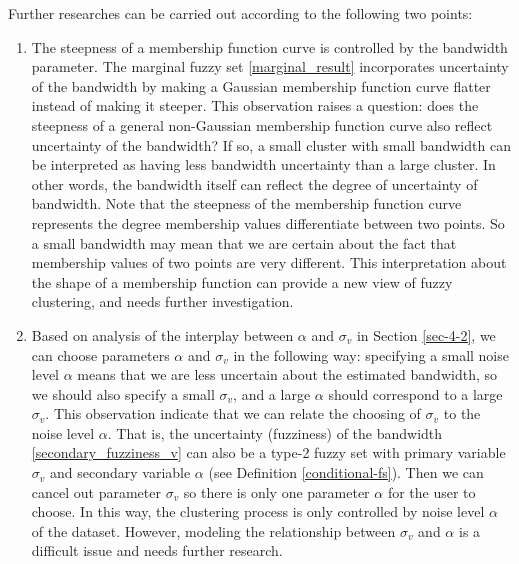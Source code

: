 \documentclass[journal]{IEEEtran}
\theoremstyle{definition}
\begin{document}
Further researches can be carried out according to the following two points:
\begin{enumerate}
\item The steepness of a membership function curve is controlled by the bandwidth parameter. The marginal fuzzy set \ref{marginal_result} incorporates uncertainty of the bandwidth by making a Gaussian membership function curve flatter instead of making it steeper. This observation raises a question: does the steepness of a general non-Gaussian membership function curve also reflect uncertainty of the bandwidth? If so, a small cluster with small bandwidth can be interpreted as having less bandwidth uncertainty than a large cluster. In other words, the bandwidth itself can reflect the degree of uncertainty of bandwidth. Note that the steepness of the membership function curve represents the degree membership values differentiate between two points. So a small bandwidth may mean that we are certain about the fact that membership values of two points are very different. This interpretation about the shape of a  membership function can provide a new view of fuzzy clustering, and needs further investigation.
\item Based on analysis of the interplay between $\alpha$ and $\sigma_v$ in Section \ref{sec-4-2}, we can choose parameters $\alpha$ and $\sigma_v$ in the following way: specifying a small noise level $\alpha$ means that we are less uncertain about the estimated bandwidth, so we should also specify a small $\sigma_v$, and a large $\alpha$ should correspond to a large $\sigma_v$. This observation indicate that we can relate the choosing of $\sigma_v$ to the noise level $\alpha$. That is, the uncertainty (fuzziness) of the bandwidth \eqref{secondary_fuzziness_v} can also be a type-2 fuzzy set with primary variable $\sigma_v$ and secondary variable $\alpha$ (see Definition \ref{conditional-fs}). Then we can cancel out  parameter $\sigma_v$ so there is only one parameter $\alpha$ for the user to choose. In this way, the clustering process is only controlled by noise level $\alpha$ of the dataset. However, modeling the relationship between $\sigma_v$ and $\alpha$ is a difficult issue and needs further research.
\end{enumerate}


\end{document}

